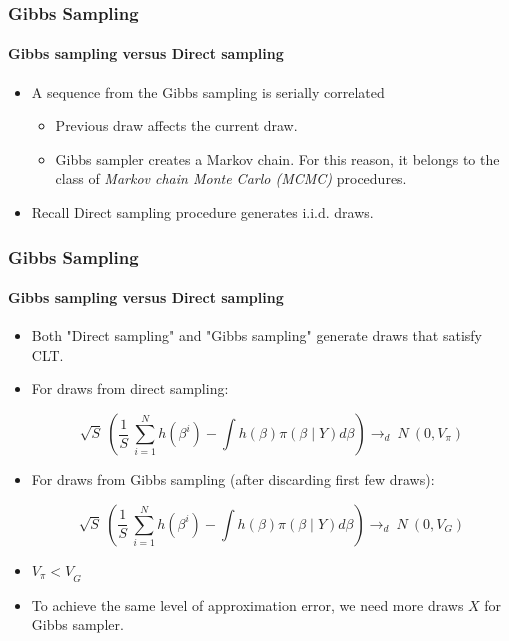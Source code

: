 \documentclass[
  shownotes,
  xcolor={svgnames},
  hyperref={colorlinks,citecolor=DarkBlue,linkcolor=DarkRed,urlcolor=DarkBlue}
  , aspectratio=169]{beamer}
\begin{document}
\begin{frame}[fragile]
\frametitle{Gibbs Sampling} 
\framesubtitle{Gibbs sampling versus Direct sampling}


\begin{itemize}


    \item A sequence from the Gibbs sampling is serially correlated
    \medskip
    \begin{itemize}
        \item Previous draw affects the current draw.
        \medskip
        \item Gibbs sampler creates a Markov chain. For this reason, it belongs to the class of {\it Markov chain Monte Carlo (MCMC)} procedures.
        \medskip
    \end{itemize}
    \item Recall Direct sampling procedure generates $\text{i.i.d.}$ draws.
\end{itemize}
 
 \end{frame}
\begin{frame}[fragile]
\frametitle{Gibbs Sampling} 
\framesubtitle{Gibbs sampling versus Direct sampling}

\begin{itemize}
\item Both "Direct sampling" and "Gibbs sampling" generate draws that satisfy CLT.

\item For draws from direct sampling:

$$\sqrt{S}\ \left( \frac{1}{S}\ \sum_{i = 1}^{N}h\left( \beta^{i} \right)  - \int{h\left( \beta \right)\pi\left( \beta \middle| Y \right)d\beta} \right)  \rightarrow_{d}\ N\ (0,V_\pi)$$


\item For draws from Gibbs sampling (after discarding first few draws):

$$\sqrt{S}\ \left( \frac{1}{S}\ \sum_{i = 1}^{N}h\left( \beta^{i} \right)  - \int{h\left( \beta \right)\pi\left( \beta \middle| Y \right)d\beta} \right)  \rightarrow_{d}\ N\ (0,V_{G})$$


\item ${V_{\pi} < V}_{G}$

\item To achieve the same level of approximation error, we need more draws $X$ for Gibbs sampler.
\end{itemize}
 \end{frame}
\end{document}

